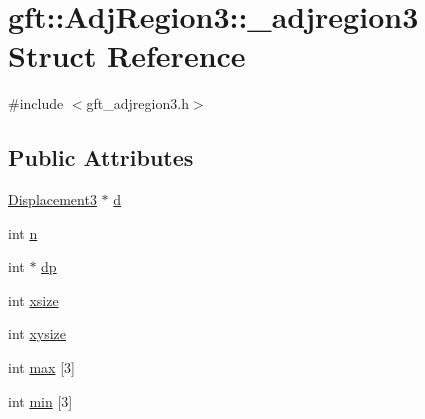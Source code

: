 \hypertarget{structgft_1_1AdjRegion3_1_1__adjregion3}{\section{gft\-:\-:Adj\-Region3\-:\-:\-\_\-adjregion3 Struct Reference}
\label{structgft_1_1AdjRegion3_1_1__adjregion3}
}


{\ttfamily \#include $<$gft\-\_\-adjregion3.\-h$>$}

\subsection*{Public Attributes}
\begin{DoxyCompactItemize}
\item 
\hyperlink{namespacegft_1_1AdjRegion3_a36e3b3c33b2dfaebe493f4abf791ee4c}{Displacement3} $\ast$ \hyperlink{structgft_1_1AdjRegion3_1_1__adjregion3_a61e32356b37a8beb8e6778c65d1c1917}{d}
\item 
int \hyperlink{structgft_1_1AdjRegion3_1_1__adjregion3_abc20e7d7d2e211de9a4e467854c5e18d}{n}
\item 
int $\ast$ \hyperlink{structgft_1_1AdjRegion3_1_1__adjregion3_afbd629a76c623592162cf237aa3c077b}{dp}
\item 
int \hyperlink{structgft_1_1AdjRegion3_1_1__adjregion3_a4037356e2aa308226792442cbc1f7754}{xsize}
\item 
int \hyperlink{structgft_1_1AdjRegion3_1_1__adjregion3_ad70bcfe7793b3d3468b3360339f1a1ff}{xysize}
\item 
int \hyperlink{structgft_1_1AdjRegion3_1_1__adjregion3_a2713b02ce47368ef66ca13028e1b15d1}{max} \mbox{[}3\mbox{]}
\item 
int \hyperlink{structgft_1_1AdjRegion3_1_1__adjregion3_a4f8a9dd3f56f3f5d5fb3d26d45edf782}{min} \mbox{[}3\mbox{]}
\end{DoxyCompactItemize}


